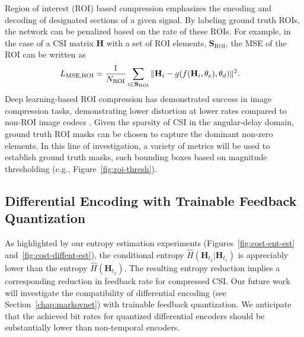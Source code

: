 Region of interest (ROI) based compression emphasizes the encoding and decoding of designated sections of a given signal. By labeling ground truth ROIs, the network can be penalized based on the rate of these ROIs. For example, in the case of a CSI matrix $\mathbf H$ with a set of ROI elements, $\mathbf S_{\text{ROI}}$, the MSE of the ROI can be written as
\begin{align*}
	L_{\text{MSE,ROI}} &= \frac{1}{N_{\text{ROI}}} \sum_{i\in\mathbf S_{\text{ROI}}}\Arrowvert \mathbf H_i - g(f(\mathbf H_i, \theta_e), \theta_d) \Arrowvert^2.
\end{align*}
Deep learning-based ROI compression has demonstrated success in image compression tasks, demonstrating lower distortion at lower rates compared to non-ROI image codecs \cite{ref:Cai2020EndToEndOptimizedROIImageCompression}. Given the sparsity of CSI in the angular-delay domain, ground truth ROI masks can be chosen to capture the dominant non-zero elements. In this line of investigation, a variety of metrics will be used to establish ground truth masks, such bounding boxes based on magnitude thresholding (e.g., Figure~\ref{fig:roi-thresh}). 

\subsection{Differential Encoding with Trainable Feedback Quantization}

As highlighted by our entropy estimation experiments (Figures~\ref{fig:cost-ent-est} and~\ref{fig:cost-diffent-est}), the conditional entropy $\hat H(\mathbf H_{t_2}|\mathbf H_{t_1})$ is appreciably lower than the entropy $\hat H(\mathbf H_{t_2})$. The resulting entropy reduction implies a corresponding reduction in feedback rate for compressed CSI. Our future work will investigate the compatibility of differential encoding (see Section~\ref{chap:markovnet}) with trainable feedback quantization. We anticipate that the achieved bit rates for quantized differential encoders should be substantially lower than non-temporal encoders.
